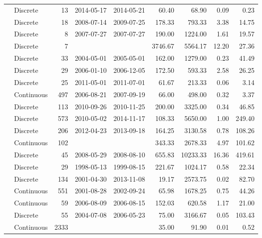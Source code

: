 \begin{table}[ht]
\begin{tabular}{llrllrrrr}
  \citet{Gonnelli2016} & Discrete &  13 & 2014-05-17 & 2014-05-21 & 60.40 & 68.90 & 0.09 & 0.23 \\ 
  \citet{Griffin2011} & Discrete &  18 & 2008-07-14 & 2009-07-25 & 178.33 & 793.33 & 3.38 & 14.75 \\ 
  \citet{Gueguen2011} & Discrete &   8 & 2007-07-27 & 2007-07-27 & 190.00 & 1224.00 & 1.61 & 19.57 \\ 
  \citet{guo2014} & Discrete &   7 &  &  & 3746.67 & 5564.17 & 12.20 & 27.36 \\ 
  \citet{Helms2008} & Discrete &  33 & 2004-05-01 & 2005-05-01 & 162.00 & 1279.00 & 0.23 & 41.49 \\ 
  \citet{Hernes2008} & Discrete &  29 & 2006-01-10 & 2006-12-05 & 172.50 & 593.33 & 2.58 & 26.25 \\ 
  \citet{Hur2014} & Discrete &  25 & 2011-05-01 & 2011-07-01 & 61.67 & 213.33 & 0.06 & 3.14 \\ 
  \citet{kattegat} & Continuous & 497 & 2006-08-21 & 2007-09-19 & 66.00 & 498.00 & 0.32 & 3.37 \\ 
  \citet{Kellerman2015} & Discrete & 113 & 2010-09-26 & 2010-11-25 & 200.00 & 3325.00 & 0.34 & 46.85 \\ 
  \citet{Lambert2015a} & Discrete & 573 & 2010-05-02 & 2014-11-17 & 108.33 & 5650.00 & 1.00 & 249.40 \\ 
  \citet{Loken2016} & Discrete & 206 & 2012-04-23 & 2013-09-18 & 164.25 & 3130.58 & 0.78 & 108.26 \\ 
  \citet{lter2004} & Continuous & 102 &  &  & 343.33 & 2678.33 & 4.97 & 101.62 \\ 
  \citet{lter2008} & Discrete &  45 & 2008-05-29 & 2008-08-10 & 655.83 & 10233.33 & 16.36 & 419.61 \\ 
  \citet{lter5653} & Discrete &  29 & 1998-05-13 & 1999-08-15 & 221.67 & 1024.17 & 0.58 & 22.34 \\ 
  \citet{lter5689} & Discrete & 134 & 2001-04-30 & 2013-11-08 & 19.17 & 2573.75 & 0.02 & 82.70 \\ 
  \citet{Markager2011} & Continuous & 551 & 2001-08-28 & 2002-09-24 & 65.98 & 1678.25 & 0.75 & 44.26 \\ 
  \citet{Massicotte2011EA} & Continuous &  59 & 2006-08-09 & 2006-08-15 & 152.03 & 620.58 & 1.17 & 21.00 \\ 
  \citet{Moran2006} & Discrete &  55 & 2004-07-08 & 2006-05-23 & 75.00 & 3166.67 & 0.05 & 103.43 \\ 
  \citet{Nelson2002, Nelson2007, Nelson2010} & Continuous & 2333 &  &  & 35.00 & 91.90 & 0.01 & 0.52 \\ 

\end{tabular}
\end{table}

